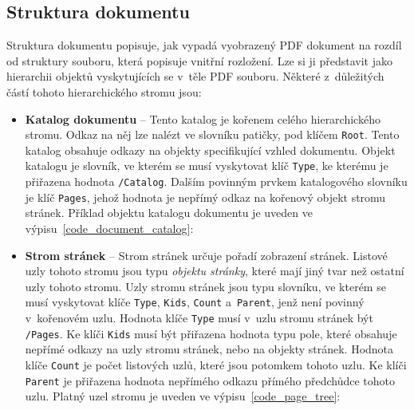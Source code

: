 \subsection*{Struktura dokumentu} \label{document_structure}
Struktura dokumentu popisuje, jak vypadá vyobrazený PDF dokument na rozdíl
od struktury souboru, která popisuje vnitřní rozložení.
Lze si ji představit jako hierarchii objektů vyskytujících se v~těle PDF souboru.
Některé z~důležitých částí tohoto hierarchického stromu jsou:
\begin{itemize}
    \item \textbf{Katalog dokumentu} -- Tento katalog je kořenem celého
    hierarchického stromu. Odkaz na něj lze nalézt ve slovníku patičky, pod klíčem
    \texttt{Root}. Tento katalog obsahuje odkazy na objekty specifikující vzhled
    dokumentu. Objekt katalogu je slovník, ve kterém se musí vyskytovat klíč
    \texttt{Type}, ke kterému je přiřazena hodnota \texttt{/Catalog}. Dalším
    povinným prvkem katalogového slovníku je klíč \texttt{Pages}, jehož hodnota je
    nepřímý odkaz na kořenový objekt stromu stránek. Příklad objektu katalogu
    dokumentu je uveden ve výpisu~\ref{code_document_catalog}:

    \item \textbf{Strom stránek} -- Strom stránek určuje pořadí zobrazení stránek.
    Listové uzly tohoto stromu jsou typu \emph{objektu stránky}, které mají jiný
    tvar než ostatní uzly tohoto stromu. Uzly stromu stránek jsou typu slovníku,
    ve kterém se musí vyskytovat klíče \texttt{Type}, \texttt{Kids},
    \texttt{Count} a~\texttt{Parent}, jenž není povinný v~kořenovém uzlu.
    Hodnota klíče \texttt{Type} musí v~uzlu stromu stránek být \texttt{/Pages}.
    Ke klíči \texttt{Kids} musí být přiřazena hodnota typu pole, které obsahuje
    nepřímé odkazy na uzly stromu stránek, nebo na objekty stránek. Hodnota klíče
    \texttt{Count} je počet listových uzlů, které jsou potomkem tohoto uzlu. Ke
    klíči \texttt{Parent} je přiřazena hodnota nepřímého odkazu přímého předchůdce
    tohoto uzlu. Platný uzel stromu je uveden ve výpisu~\ref{code_page_tree}:


\end{itemize}
